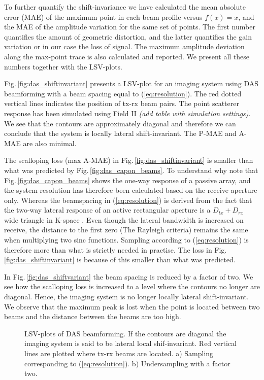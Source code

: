 \documentclass[journal]{IEEEtran}
\newcommand{\img}{img/}
\newcommand\comment[1]{\textit{{\color{red}(#1)}}}
\begin{document}
To further quantify the shift-invariance we have calculated the mean absolute error (MAE) of the maximum point in each beam profile versus $f(x)=x$, and the MAE of the amplitude variation for the same set of points. The first number quantifies the amount of geometric distortion, and the latter quantifies the gain variation or in our case the loss of signal. The maximum amplitude deviation along the max-point trace is also calculated and reported. We present all these numbers together with the LSV-plots.

Fig.\,\ref{fig:das_shiftinvariant} presents a LSV-plot for an imaging system using DAS beamforming with a beam spacing equal to (\ref{eq:resolution}). The red dotted vertical lines indicates the position of tx-rx beam pairs. The point scatterer response has been simulated using Field II \cite{Jensen1992, Jensen1996a} \comment{add table with simulation settings}. We see that the contours are approximately diagonal and therefore we can conclude that the system is locally lateral shift-invariant. The P-MAE and A-MAE are also minimal. 

The scalloping loss (max A-MAE) in Fig.\,\ref{fig:das_shiftinvariant} is smaller than what was predicted by Fig.\,\ref{fig:das_capon_beams}. To understand why note that Fig.\,\ref{fig:das_capon_beams} shows the one-way response of a passive array, and the system resolution has therefore been calculated based on the receive aperture only. Whereas the beamspacing in (\ref{eq:resolution}) is derived from the fact that the two-way lateral response of an active rectangular aperture is a $D_{tx}+D_{rx}$ wide triangle in K-space \cite{Hergum2009}. Even though the lateral bandwidth is increased on receive, the distance to the first zero (The Rayleigh criteria) remains the same when multiplying two sinc functions. Sampling according to (\ref{eq:resolution}) is therefore more than what is strictly needed in practise. The loss in Fig.\,\ref{fig:das_shiftinvariant} is because of this smaller than what was predicted.

In Fig.\,\ref{fig:das_shiftvariant} the beam spacing is reduced by a factor of two. We see how the scalloping loss is increased to a level where the contours no longer are diagonal. Hence, the imaging system is no longer locally lateral shift-invariant. We observe that the maximum peak is lost when the point is located between two beams and the distance between the beams are too high.

\begin{figure*}[!t]
\centerline{
\hfill{}
}
\caption{LSV-plots of DAS beamforming. If the contours are diagonal the imaging system is said to be lateral local shif-invariant. Red vertical lines are plotted where tx-rx beams are located. a) Sampling corresponding to (\ref{eq:resolution}). b) Undersampling with a factor two.}
\label{fig:das}
\end{figure*}
\end{document}
